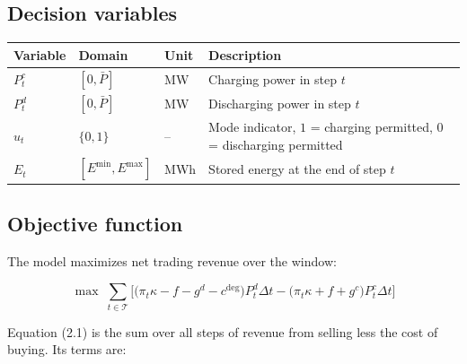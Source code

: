 \documentclass[11pt,a4paper]{article}
\numberwithin{equation}{section}
\begin{document}
\subsection{Decision variables}

\small
\begin{tabular}{@{}l l l >{\raggedright\arraybackslash}p{7.5cm}@{}}
\toprule
Variable & Domain & Unit & Description \\
\midrule
$P^{c}_{t}$ & $[0, \bar{P}]$ & MW & Charging power in step $t$ \\
$P^{d}_{t}$ & $[0, \bar{P}]$ & MW & Discharging power in step $t$ \\
$u_{t}$     & $\{0,1\}$      & -- & Mode indicator, $1$ = charging permitted, $0$ = discharging permitted \\
$E_{t}$     & $[E^{\min}, E^{\max}]$ & MWh & Stored energy at the end of step $t$ \\
\bottomrule
\end{tabular}
\normalsize

\subsection{Objective function}

The model maximizes net trading revenue over the window:

\begin{equation}
\max \; \sum_{t \in \mathcal{T}}
  \Big[ \big( \pi_t \kappa - f - g^{d} - c^{\deg} \big) P^{d}_{t} \Delta t
      - \big( \pi_t \kappa + f + g^{c} \big) P^{c}_{t} \Delta t \Big]
\end{equation}

Equation (2.1) is the sum over all steps of revenue from selling less the cost
of buying. Its terms are:
\end{document}
